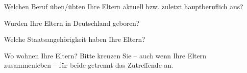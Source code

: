 \separate

\begin{choicequestion}[1]{Welchen Beruf üben/übten Ihre Eltern aktuell bzw. zuletzt hauptberuflich aus?}
\end{choicequestion}


\separate

\begin{choicegroup}{Wurden Ihre Eltern in Deutschland geboren?}
\end{choicegroup}

\separate

\begin{choicequestion}[8]{Welche Staatsangehörigkeit haben Ihre Eltern?}
	 \\
\end{choicequestion}

%
%

\separate

\begin{choicegroup}{Wo wohnen Ihre Eltern?
\newline \footnotesize{Bitte kreuzen Sie -- auch wenn Ihre Eltern zusammenleben -- für beide getrennt das Zutreffende an.}}

\end{choicegroup}

